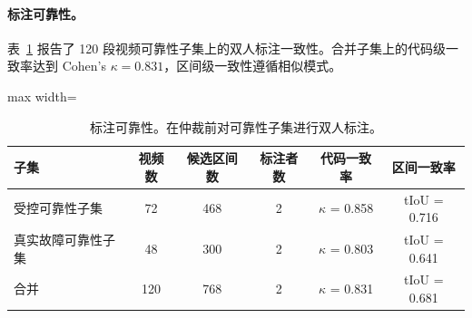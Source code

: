 \documentclass{article}
\begin{document}
\begin{table}[t]
\centering\scriptsize
\caption{标注可靠性。在仲裁前对可靠性子集进行双人标注。}
\paragraph{标注可靠性。}
表~\ref{tab:annotation_reliability} 报告了 120 段视频可靠性子集上的双人标注一致性。合并子集上的代码级一致率达到 Cohen's $\kappa=0.831$，区间级一致性遵循相似模式。

\label{tab:annotation_reliability}
\begin{adjustbox}{max width=\textwidth}
\begin{tabular}{p{}ccccc}
\toprule
子集 & 视频数 & 候选区间数 & 标注者数 & 代码一致率 & 区间一致率 \\
\midrule
受控可靠性子集 & 72 & 468 & 2 & $\kappa$ = 0.858 & tIoU = 0.716 \\
真实故障可靠性子集 & 48 & 300 & 2 & $\kappa$ = 0.803 & tIoU = 0.641 \\
合并 & 120 & 768 & 2 & $\kappa$ = 0.831 & tIoU = 0.681 \\
\bottomrule
\end{tabular}
\end{adjustbox}
\end{table}
\end{document}
